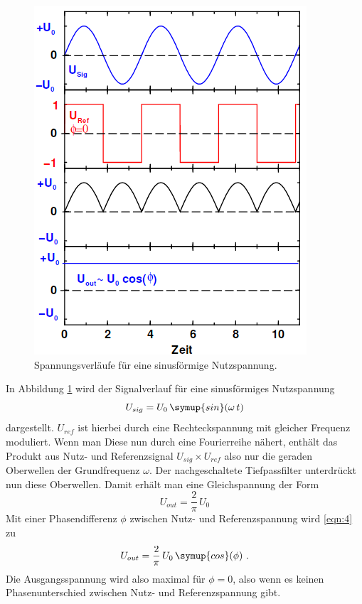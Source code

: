 \begin{figure}
  \centering
  \includegraphics[scale=0.4]{theorie.png}
  \caption{Spannungsverläufe für eine sinusförmige Nutzspannung.}
  \label{fig:1}
\end{figure}
In Abbildung \ref{fig:1} wird der Signalverlauf für eine sinusförmiges Nutzspannung
\begin{equation*}
    U_{sig} = U_0 \, \symup{sin}(\omega \, t)
\end{equation*}
dargestellt. $U_{ref}$ ist hierbei durch eine Rechteckspannung mit gleicher Frequenz
moduliert. Wenn man Diese nun durch eine Fourierreihe nähert, enthält das Produkt
aus Nutz- und Referenzsignal $U_{sig} \times U_{ref}$ also nur die geraden Oberwellen
der Grundfrequenz $\omega$. %
Der nachgeschaltete Tiefpassfilter unterdrückt nun diese Oberwellen. Damit erhält
man eine Gleichspannung der Form
\begin{equation}
    U_{out} = \frac{2}{\pi} \, U_0
    \label{eqn:4}
\end{equation}
Mit einer Phasendifferenz $\phi$ zwischen Nutz- und Referenzspannung wird
\eqref{eqn:4} zu
\begin{equation}
  U_{out} = \frac{2}{\pi} \, U_0 \, \symup{cos}(\phi) \ .
  \label{eqn:5}
\end{equation}
Die Ausgangsspannung wird also maximal für $\phi = 0$, also wenn es keinen Phasenunterschied
zwischen Nutz- und Referenzspannung gibt.


